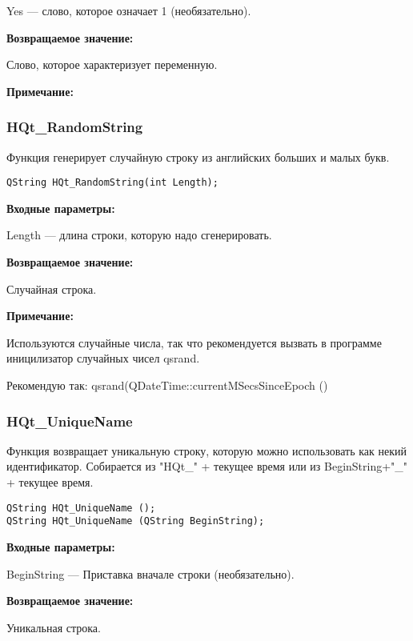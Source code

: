\documentclass[a4paper,12pt]{article}
\begin{document}
    Yes --- слово, которое означает 1 (необязательно).

\textbf{Возвращаемое значение:}

Слово, которое характеризует переменную.

\textbf{Примечание:}


\subsubsection{HQt\_RandomString}\label{HQt_RandomString}

Функция генерирует случайную строку из английских больших и малых букв.


\begin{lstlisting}[label=code_syntax_HQt_RandomString,caption=Синтаксис]
QString HQt_RandomString(int Length);
\end{lstlisting}

\textbf{Входные параметры:}

Length --- длина строки, которую надо сгенерировать.

\textbf{Возвращаемое значение:}

Случайная строка.

\textbf{Примечание:}

Используются случайные числа, так что рекомендуется вызвать в программе иницилизатор случайных чисел qsrand.

Рекомендую так: qsrand(QDateTime::currentMSecsSinceEpoch () %


\subsubsection{HQt\_UniqueName}\label{HQt_UniqueName}

Функция возвращает уникальную строку, которую можно использовать как некий идентификатор. Собирается из "HQt\_" + текущее время или из BeginString+"\_" + текущее время.


\begin{lstlisting}[label=code_syntax_HQt_UniqueName,caption=Синтаксис]
QString HQt_UniqueName ();
QString HQt_UniqueName (QString BeginString);
\end{lstlisting}

\textbf{Входные параметры:}

BeginString --- Приставка вначале строки (необязательно).

\textbf{Возвращаемое значение:}

Уникальная строка.
\end{document}
